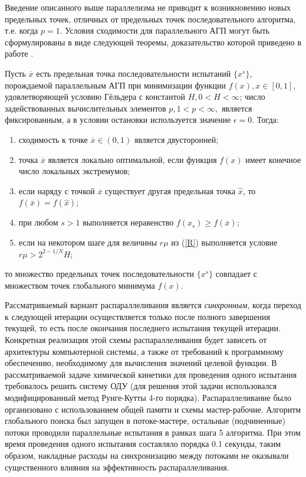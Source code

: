 \documentclass{cmi}
\begin{document}
Введение описанного выше параллелизма не приводит к возникновению новых предельных точек, отличных от предельных точек последовательного алгоритма, т.е. когда $p = 1$. Условия сходимости для параллельного АГП могут быть сформулированы в виде следующей теоремы, доказательство которой приведено в работе .

\begin{theorem*}%
	Пусть $\overline{x}$ есть предельная точка последовательности испытаний $\{x^s\}$, порождаемой параллельным АГП при минимизации функции $f(x), x\in [0,1],$ удовлетворяющей условию Гёльдера с константой $H, 0<H<\infty$; число задействованных вычислительных элементов $p, 1<p<\infty,$ является фиксированным, а в условии остановки используется значение $\epsilon = 0$. Тогда:
	\begin{enumerate}
		\item
		сходимость к точке $\overline{x} \in (0,1) $ является двусторонней;
		\item
		точка $\overline{x}$ является локально оптимальной, если функция $f(x)$ имеет конечное число локальных экстремумов;
		\item
		если наряду с точкой $\overline{x}$ существует другая предельная точка $\widehat{x}$, то $f(\overline{x})=f(\widehat{x})$;
		\item
		при любом $s>1$ выполняется неравенство $f(x_s) \geqslant f(\overline{x})$;
		\item
		если на некотором шаге для величины $r\mu$ из (\ref{R}) выполняется условие $r\mu > 2^{2-1/N}H$;
	\end{enumerate}
	то множество предельных точек последовательности $\{x^s\}$ совпадает с множеством точек глобального минимума $f(x)$.
\end{theorem*}

Рассматриваемый вариант распараллеливания является \textit{синхронным}, когда переход к следующей итерации осуществляется только после полного завершения текущей, то есть после окончания последнего испытания текущей итерации. 
Конкретная реализация этой схемы распараллеливания будет зависеть от архитектуры компьютерной системы, а также от требований к программному обеспечению, необходимому для вычисления значений целевой функции. 
В рассматриваемой задаче химической кинетики для проведения одного испытания требовалось решить систему ОДУ (для решения этой задачи использовался модифицированный метод Рунге-Кутты 4-го порядка). Распараллеливание было организовано с использованием общей памяти и схемы мастер-рабочие. Алгоритм глобального поиска был запущен в потоке-мастере, остальные (подчиненные) потоки проводили параллельные испытания в рамках шага 5 алгоритма. При этом время проведения одного испытания составляло порядка 0.1 секунды, таким образом, накладные расходы на синхронизацию между потоками не оказывали существенного влияния на эффективность распараллеливания.
\end{document}
